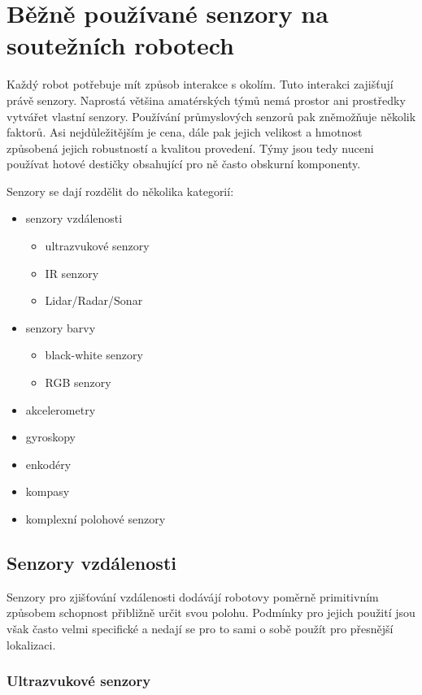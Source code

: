 \chapter{Běžně používané senzory na soutežních robotech}

Každý robot potřebuje mít způsob interakce s okolím.
Tuto interakci zajišťují právě senzory.
Naprostá většina amatérských týmů nemá prostor ani prostředky vytvářet vlastní senzory.
Používání průmyslových senzorů pak zněmožňuje několik faktorů.
Asi nejdůležitějším je cena, dále pak jejich velikost a hmotnost způsobená jejich robustností a kvalitou provedení.
Týmy jsou tedy nuceni používat hotové destičky obsahující pro ně často obskurní komponenty.

Senzory se dají rozdělit do několika kategorií:
\begin{itemize}
    \item senzory vzdálenosti
        \begin{itemize}
            \item ultrazvukové senzory
            \item IR senzory
            \item Lidar/Radar/Sonar
        \end{itemize}
    \item senzory barvy
        \begin{itemize}
            \item black-white senzory
            \item RGB senzory
        \end{itemize}
    \item akcelerometry
    \item gyroskopy
    \item enkodéry
    \item kompasy
    \item komplexní polohové senzory
\end{itemize}

\section{Senzory vzdálenosti}

Senzory pro zjišťování vzdálenosti dodávájí robotovy poměrně primitivním způsobem schopnost přibližně určit svou polohu.
Podmínky pro jejich použití jsou však často velmi specifické a nedají se pro to sami o sobě použít pro přesnější lokalizaci.

\subsection{Ultrazvukové senzory}

